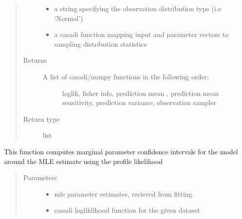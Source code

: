 \documentclass[letterpaper,10pt,english,openany,oneside]{sphinxmanual}
\begin{document}
\begin{fulllineitems}
\begin{fulllineitems}
\begin{quote}
\begin{description}
\begin{itemize}
\item {} 
 \textendash{} a string specifying the observation distribution type (i.e ‘Normal’)

\item {} 
 \textendash{} a casadi function mapping input and parameter vectors to sampling distribution statistics

\end{itemize}

\item[{Returns}] \leavevmode
\begin{description}
\item[{A list of casadi/numpy functions in the following order;}] \leavevmode
loglik, fisher info, prediction mean , prediction mean sensitivity,
prediction variance, observation sampler

\end{description}


\item[{Return type}] \leavevmode
list

\end{description}\end{quote}

\end{fulllineitems}


\begin{fulllineitems}
\label{\detokenize{nloed:nloed.model.Model.__confidence_intervals}}
This function computes marginal parameter confidence intervals for the model
around the MLE estimate using the profile likelihood
\begin{quote}\begin{description}
\item[{Parameters}] \leavevmode\begin{itemize}
\item {} 
 \textendash{} mle parameter estimates,  recieved from fitting

\item {} 
 \textendash{} casadi logliklihood function for the given dataset


\end{itemize}
\end{description}
\end{quote}
\end{fulllineitems}
\end{fulllineitems}
\end{document}
